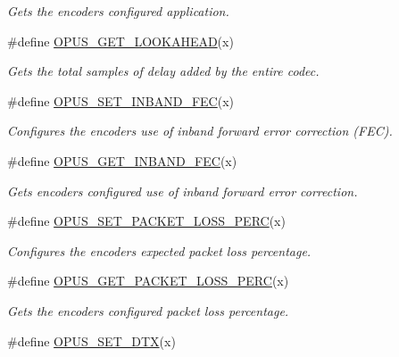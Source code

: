 \begin{DoxyCompactItemize}
\begin{DoxyCompactList}\small\item\em Gets the encoder\textquotesingle{}s configured application. \end{DoxyCompactList}\item 
\#define \hyperlink{group__opus__encoderctls_gaf81b9e01501910adc67195ebb42b4a54}{O\+P\+U\+S\+\_\+\+G\+E\+T\+\_\+\+L\+O\+O\+K\+A\+H\+E\+AD}(x)
\begin{DoxyCompactList}\small\item\em Gets the total samples of delay added by the entire codec. \end{DoxyCompactList}\item 
\#define \hyperlink{group__opus__encoderctls_ga5b67dc832aa46c1c2f35752c46380545}{O\+P\+U\+S\+\_\+\+S\+E\+T\+\_\+\+I\+N\+B\+A\+N\+D\+\_\+\+F\+EC}(x)
\begin{DoxyCompactList}\small\item\em Configures the encoder\textquotesingle{}s use of inband forward error correction (F\+EC). \end{DoxyCompactList}\item 
\#define \hyperlink{group__opus__encoderctls_gaf792b27a6277ddf786413dbf472d0ac8}{O\+P\+U\+S\+\_\+\+G\+E\+T\+\_\+\+I\+N\+B\+A\+N\+D\+\_\+\+F\+EC}(x)
\begin{DoxyCompactList}\small\item\em Gets encoder\textquotesingle{}s configured use of inband forward error correction. \end{DoxyCompactList}\item 
\#define \hyperlink{group__opus__encoderctls_gafda1c951dea919ba54432cd03827f1a9}{O\+P\+U\+S\+\_\+\+S\+E\+T\+\_\+\+P\+A\+C\+K\+E\+T\+\_\+\+L\+O\+S\+S\+\_\+\+P\+E\+RC}(x)
\begin{DoxyCompactList}\small\item\em Configures the encoder\textquotesingle{}s expected packet loss percentage. \end{DoxyCompactList}\item 
\#define \hyperlink{group__opus__encoderctls_gaa79261c6a55444993fca8d3a3a29d519}{O\+P\+U\+S\+\_\+\+G\+E\+T\+\_\+\+P\+A\+C\+K\+E\+T\+\_\+\+L\+O\+S\+S\+\_\+\+P\+E\+RC}(x)
\begin{DoxyCompactList}\small\item\em Gets the encoder\textquotesingle{}s configured packet loss percentage. \end{DoxyCompactList}\item 
\#define \hyperlink{group__opus__encoderctls_ga4f053b2db8c5162293213aabfe123773}{O\+P\+U\+S\+\_\+\+S\+E\+T\+\_\+\+D\+TX}(x)

\end{DoxyCompactItemize}
